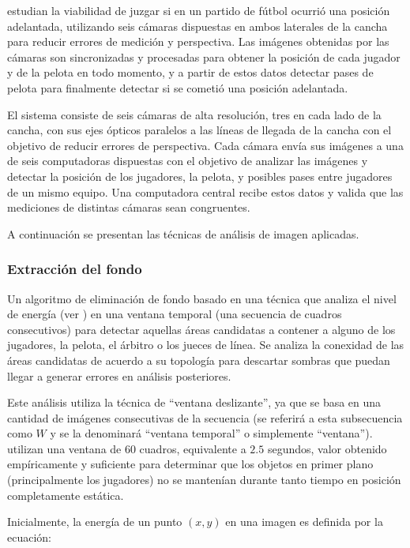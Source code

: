 \citeauthor*{papers-tanos} estudian la viabilidad de juzgar si en un partido de fútbol
ocurrió una posición adelantada, utilizando seis cámaras dispuestas en ambos
laterales de la cancha para reducir errores de medición y perspectiva. Las
imágenes obtenidas por las cámaras son sincronizadas y procesadas para obtener
la posición de cada jugador y de la pelota en todo momento, y a partir de estos
datos detectar pases de pelota para finalmente detectar si se cometió una
posición adelantada.

El sistema consiste de seis cámaras de alta resolución, tres en cada lado de
la cancha, con sus ejes ópticos paralelos a las líneas de llegada de la cancha
con el objetivo de reducir errores de perspectiva. Cada cámara envía sus
imágenes a una de seis computadoras dispuestas con el objetivo de analizar las
imágenes y detectar la posición de los jugadores, la pelota, y posibles pases
entre jugadores de un mismo equipo. Una computadora central recibe estos datos y
valida que las mediciones de distintas cámaras sean congruentes.

A continuación se presentan las técnicas de análisis de imagen aplicadas.

\subsubsection{Extracción del fondo}
Un algoritmo de eliminación de fondo basado en una técnica que analiza el nivel
de energía (ver \cite{tanos-cita-21}) en una ventana temporal (una secuencia de
cuadros consecutivos) para detectar aquellas áreas candidatas a contener a
alguno de los jugadores, la pelota, el árbitro o los jueces de línea. Se
analiza la conexidad de las áreas candidatas de acuerdo a su topología para
descartar sombras que puedan llegar a generar errores en análisis posteriores.

Este análisis utiliza la técnica de ``ventana deslizante'', ya que
se basa en una cantidad de imágenes consecutivas de la secuencia (se referirá a
esta subsecuencia como $W$ y se la denominará ``ventana temporal'' o simplemente
``ventana''). \citeauthor*{papers-tanos} utilizan una ventana de 60 cuadros,
equivalente a $2.5$ segundos, valor obtenido empíricamente y suficiente para
determinar que los objetos en primer plano (principalmente los jugadores) no
se mantenían durante tanto tiempo en posición completamente estática.

Inicialmente, la energía de un punto $(x, y)$ en una imagen es definida por la
ecuación:

